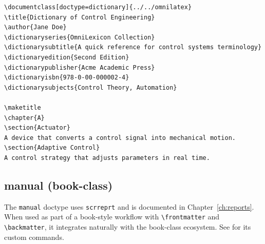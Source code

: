 \begin{verbatim}
\documentclass[doctype=dictionary]{../../omnilatex}
\title{Dictionary of Control Engineering}
\author{Jane Doe}
\dictionaryseries{OmniLexicon Collection}
\dictionarysubtitle{A quick reference for control systems terminology}
\dictionaryedition{Second Edition}
\dictionarypublisher{Acme Academic Press}
\dictionaryisbn{978-0-00-000002-4}
\dictionarysubjects{Control Theory, Automation}

\maketitle
\chapter{A}
\section{Actuator}
A device that converts a control signal into mechanical motion.
\section{Adaptive Control}
A control strategy that adjusts parameters in real time.

\end{verbatim}

\subsection{manual (book-class)}

The \texttt{manual} doctype uses \texttt{scrreprt} and is documented in
Chapter~\ref{ch:reports}.  When used as part of a book-style workflow with
\texttt{\textbackslash frontmatter} and \texttt{\textbackslash backmatter},
it integrates naturally with the book-class ecosystem.  See
 for its custom commands.
